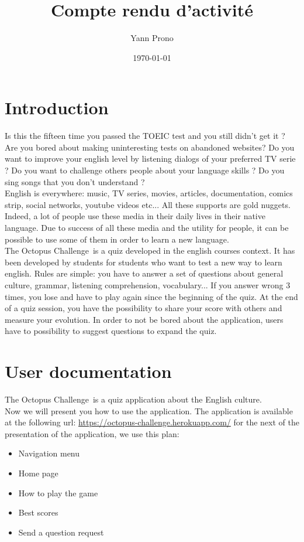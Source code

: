 \documentclass[a4paper,11pt, oneside]{book}
\title{Compte rendu d'activité}
\author{Yann Prono}
\date{\today}
\def\appName{The Octopus Challenge}
\begin{document}
	\begin{titlepage}
		
	\end{titlepage}


	\newpage

	\newpage\null\thispagestyle{empty}\newpage
	\setcounter{page}{1}
	\tableofcontents

	\chapter{Introduction}

Is this the fifteen time you passed the TOEIC test and you still didn't get it ?
Are you bored about making uninteresting tests on abandoned websites?
Do you want to improve your english level by listening dialogs of your preferred TV serie ?
Do you want to challenge others people about your language skills ?
Do you sing songs that you don't understand ?\\

\noindent English is everywhere: music, TV series, movies, articles, documentation, comics strip, social networks, youtube videos etc...
All these supports are gold nuggets. Indeed, a lot of people use these media in their daily lives in their native language.
Due to success of all these media and the utility for people, it can be possible to use some of them in order to learn a new language.\\

\noindent \appName \ is a quiz developed in the english courses context. It has been developed by students for students who want to test a new way to learn english.
Rules are simple: you have to answer a set of questions about general culture, grammar, listening comprehension, vocabulary... If you answer wrong 3 times, you lose and have to play again since the beginning of the quiz.
At the end of a quiz session, you have the possibility to share your score with others and measure your evolution.
In order to not be bored about the application, users have to possibility to suggest questions to expand the quiz.

\setcounter{page}{1}
	\clearpage


\chapter{User documentation}
	\appName \ is a quiz application about the English culture.\\
	Now we will present you how to use the application. The application is available at the following url:
	\href{https://octopus-challenge.herokuapp.com/}{https://octopus-challenge.herokuapp.com/}
	for the next of the presentation of the application, we use this plan:
	\begin{itemize}
		\item Navigation menu
		\item Home page
		\item How to play the game
		\item Best scores
		\item Send a question request\\
	\end{itemize}
\end{document}
